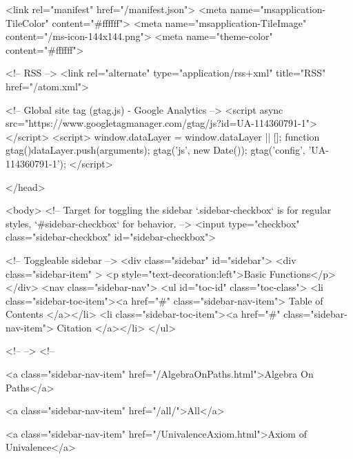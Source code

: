   <link rel="manifest" href="/manifest.json">
  <meta name="msapplication-TileColor" content="#ffffff">
  <meta name="msapplication-TileImage" content="/ms-icon-144x144.png">
  <meta name="theme-color" content="#ffffff">
  
  <!-- RSS -->
  <link rel="alternate" type="application/rss+xml" title="RSS" href="/atom.xml">

  <!-- Global site tag (gtag.js) - Google Analytics -->
  <script async src="https://www.googletagmanager.com/gtag/js?id=UA-114360791-1"></script>
  <script>
    window.dataLayer = window.dataLayer || [];
    function gtag(){dataLayer.push(arguments);}
    gtag('js', new Date());
    gtag('config', 'UA-114360791-1');
  </script>

  
</head>




  <body>
    <!-- Target for toggling the sidebar `.sidebar-checkbox` is for regular
     styles, `#sidebar-checkbox` for behavior. -->
<input type="checkbox" class="sidebar-checkbox" id="sidebar-checkbox">

<!-- Toggleable sidebar -->
<div class="sidebar" id="sidebar">
  <div class="sidebar-item" >
    <p style="text-decoration:left">Basic Functions</p>
  </div>
  <nav class="sidebar-nav">
    <ul id="toc-id" class="toc-class">
  <li class="sidebar-toc-item"><a href="#" class="sidebar-nav-item"> Table of Contents </a></li>
  <li class="sidebar-toc-item"><a href="#" class="sidebar-nav-item"> Citation </a></li>
</ul>


    <!--  -->
    <!-- 
      
    
      
    
      
    
      
        
      
    
      
        
          <a class="sidebar-nav-item" href="/AlgebraOnPaths.html">Algebra On Paths</a>
        
      
    
      
        
          <a class="sidebar-nav-item" href="/all/">All</a>
        
      
    
      
        
          <a class="sidebar-nav-item" href="/UnivalenceAxiom.html">Axiom of Univalence</a>
        
      
    
      
        
